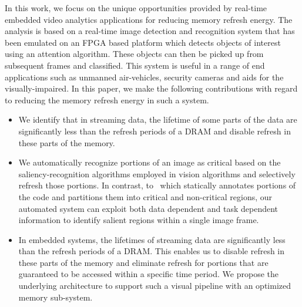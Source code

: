 In this work, we focus on the unique opportunities provided by real-time embedded video analytics applications for reducing memory refresh energy. The analysis is based on a real-time image detection and recognition system that has been emulated on an FPGA based platform which detects objects of interest using an attention algorithm. These objects can then be picked up from subsequent frames and classified. This system is useful in a range of end applications such as unmanned air-vehicles, security cameras and aids for the visually-impaired. In this paper, we make the following contributions with regard to reducing the memory refresh energy in such a system.
\vspace{-0.1in}
\begin{itemize}[leftmargin=*]
\item We identify that in streaming data, the lifetime of some parts of the data are significantly less than the refresh periods of a DRAM and disable refresh in these parts of the memory. 
\item We automatically recognize portions of an image as critical based on the saliency-recognition algorithms employed in vision algorithms and selectively refresh those portions.
In contrast, to~\cite{Liu2011} which statically annotates portions of the code and partitions them into critical and non-critical regions, our automated system can exploit both data dependent and task dependent information to identify salient regions within a single image frame. 
\item In embedded systems, the lifetimes of streaming data are significantly less than the refresh periods of a DRAM. This enables us to disable refresh in these parts of the memory and eliminate refresh for portions that are guaranteed to be accessed within a specific time period. We propose the underlying architecture to support such a visual pipeline with an optimized memory sub-system.
\end{itemize}
